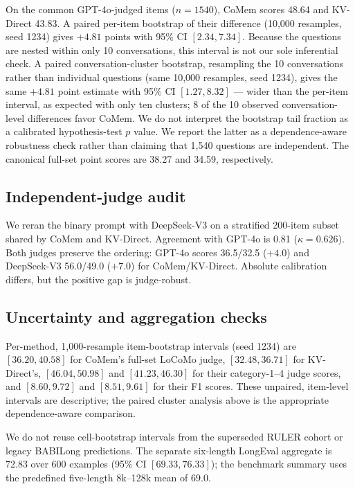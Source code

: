 On the common GPT-4o-judged items ($n{=}1540$), CoMem scores 48.64 and KV-Direct
43.83. A paired per-item bootstrap of their difference (10,000 resamples,
seed 1234) gives $+4.81$ points with 95\% CI $[2.34,7.34]$. Because the questions
are nested within only 10 conversations, this interval is not our sole
inferential check. A paired conversation-cluster bootstrap, resampling the 10
conversations rather than individual questions (same 10,000 resamples,
seed 1234), gives the same $+4.81$ point estimate with 95\% CI $[1.27,8.32]$ ---
wider than the per-item interval, as expected with only ten clusters; 8 of the
10 observed conversation-level differences favor CoMem. We do not interpret
the bootstrap tail fraction as a calibrated hypothesis-test $p$ value. We report the latter as a
dependence-aware robustness check rather than claiming that 1,540 questions are
independent. The canonical full-set point
scores are 38.27 and 34.59, respectively.

\FloatBarrier
\subsection{Independent-judge audit}
We reran the binary prompt with DeepSeek-V3 on a stratified 200-item subset
shared by CoMem and KV-Direct. Agreement with GPT-4o is 0.81
($\kappa=0.626$). Both judges preserve the ordering: GPT-4o scores
36.5/32.5 ($+4.0$) and DeepSeek-V3 56.0/49.0 ($+7.0$) for CoMem/KV-Direct.
Absolute calibration differs, but the positive gap is judge-robust.

\subsection{Uncertainty and aggregation checks}
Per-method, 1,000-resample item-bootstrap intervals (seed 1234) are
$[36.20,40.58]$ for CoMem's full-set LoCoMo judge, $[32.48,36.71]$ for
KV-Direct's, $[46.04,50.98]$ and $[41.23,46.30]$ for their category-1--4 judge
scores, and $[8.60,9.72]$ and $[8.51,9.61]$ for their F1 scores. These unpaired,
item-level intervals are descriptive; the paired cluster analysis above is the
appropriate dependence-aware comparison.

We do not reuse cell-bootstrap intervals from the superseded RULER cohort or
legacy BABILong predictions. The separate six-length LongEval aggregate is
72.83 over 600 examples (95\% CI $[69.33,76.33]$); the benchmark summary
uses the predefined five-length 8k--128k mean of 69.0.
